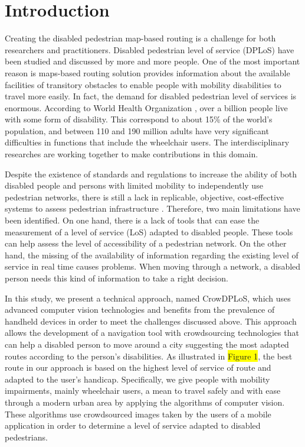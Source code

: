 \documentclass[10pt,conference,a4paper]{IEEEtran}
\begin{document}
\section{Introduction}

Creating the disabled pedestrian map-based routing is a challenge for both researchers and practitioners. Disabled pedestrian level of service (DPLoS) have been studied and discussed by more and more people. One of the most important reason is maps-based routing solution provides information about the available facilities of transitory obstacles to enable people with mobility disabilities to travel more easily. In fact, the demand for disabled pedestrian level of services is enormous. According to World Health Organization \cite{who2017}, over a billion people live with some form of disability. This correspond to about 15\% of the world’s population, and between 110 and 190 million adults have very significant difficulties in functions that include the wheelchair users. The interdisciplinary researches are working together to make contributions in this domain.

Despite the existence of standards and regulations to increase the ability of both disabled people and persons with limited mobility to independently use pedestrian networks, there is still a lack in replicable, objective, cost-effective systems to assess pedestrian infrastructure \cite{frackelton2013measuring}. Therefore, two main limitations have been identified. On one hand, there is a lack of tools that can ease the measurement of a level of service (LoS) adapted to disabled people. These tools can help assess the level of accessibility of a pedestrian network. On the other hand, the missing of the availability of information regarding the existing level of service in real time causes problems. When moving through a network, a disabled person needs this kind of information to take a right decision.

In this study, we present a technical approach, named CrowDPLoS, which uses advanced computer vision technologies and benefits from the prevalence of handheld devices in order to meet the challenges discussed above. This approach allows the development of a navigation tool with crowdsourcing technologies that can help a disabled person to move around a city suggesting the most adapted routes according to the person’s disabilities. As illustrated in \colorbox{yellow}{Figure 1}, the best route in our approach is based on the highest level of service of route and adapted to the user’s handicap. Specifically, we give people with mobility impairments, mainly wheelchair users, a mean to travel safely and with ease through a modern urban area by applying the algorithms of computer vision. These algorithms use crowdsourced images taken by the users of a mobile application in order to determine a level of service adapted to disabled pedestrians.
\end{document}
